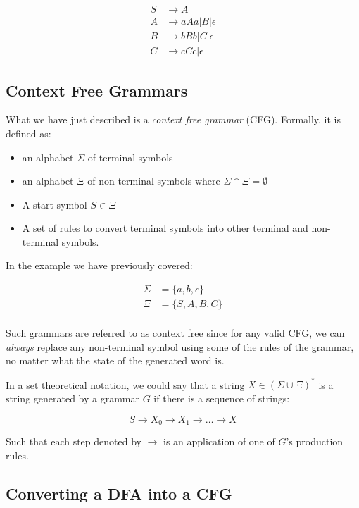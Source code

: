 \[
	\begin{split}
		S &\rightarrow A\\
		A &\rightarrow aAa | B | \epsilon\\
		B &\rightarrow bBb | C | \epsilon\\
		C &\rightarrow cCc | \epsilon
	\end{split}
\]

\subsection{Context Free Grammars}

What we have just described is a {\it context free grammar} (CFG). Formally, it
is defined as:

\begin{itemize}
	\item an alphabet $\Sigma$ of terminal symbols
	\item an alphabet $\Xi$ of non-terminal symbols where $\Sigma \cap \Xi =
		\emptyset$
	\item A start symbol $S \in \Xi$
	\item A set of rules to convert terminal symbols into other terminal and
		non-terminal symbols.
\end{itemize}

In the example we have previously covered:

\[
	\begin{split}
		\Sigma &= \{a,b,c\} \\
		\Xi &= \{S,A,B,C\} \\
	\end{split}
\]

Such grammars are referred to as context free since for any valid CFG, we can
{\it always} replace any non-terminal symbol using some of the rules of the
grammar, no matter what the state of the generated word is.

In a set theoretical notation, we could say that a string $X \in (\Sigma \cup
\Xi)^*$ is a string generated by a grammar $G$ if there is a sequence of
strings:

\[
	S \rightarrow X_0 \rightarrow X_1 \rightarrow \dots \rightarrow X
\]

Such that each step denoted by $\rightarrow$ is an application of one of $G$'s
production rules.

\subsection{Converting a DFA into a CFG}

